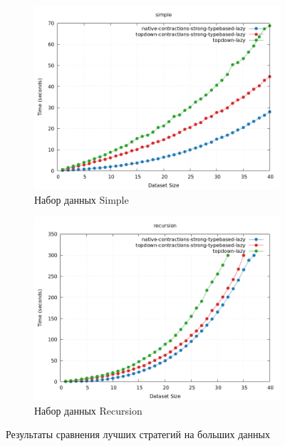 \documentclass[../thesis.tex]{subfiles}
\begin{document}
\begin{figure}[h]
    \begin{subfigure}{0.5\textwidth}
    \includegraphics[width=\linewidth]{winners_simple.png} 
    \caption{Набор данных Simple}
    \label{plot_winners_simple}
    \end{subfigure}
    \begin{subfigure}{0.5\textwidth}
    \includegraphics[width=\linewidth]{winners_recursion.png}
    \caption{Набор данных Recursion}
    \label{plot_winners_recursion}
    \end{subfigure}
    \caption{Результаты сравнения лучших стратегий на больших данных}
    \label{plot_winners}
\end{figure}
\end{document}
